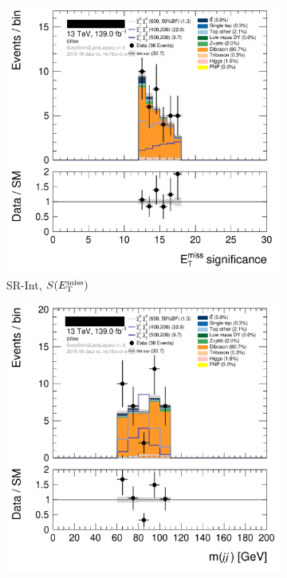 \begin{figure}[tp]
\centering
\begin{subfigure}{0.495\textwidth}
\centering
\includegraphics[width=\textwidth]{figures/2ljets_def_met_Sign_SRInt.png}
\caption{SR-Int, $S(E_\mathrm{T}^\mathrm{miss})$}
\end{subfigure}
\hfill
\begin{subfigure}{0.495\textwidth}
\centering
\includegraphics[width=\textwidth]{figures/2ljets_def_mjj_SRInt.png}

\end{subfigure}
\end{figure}
